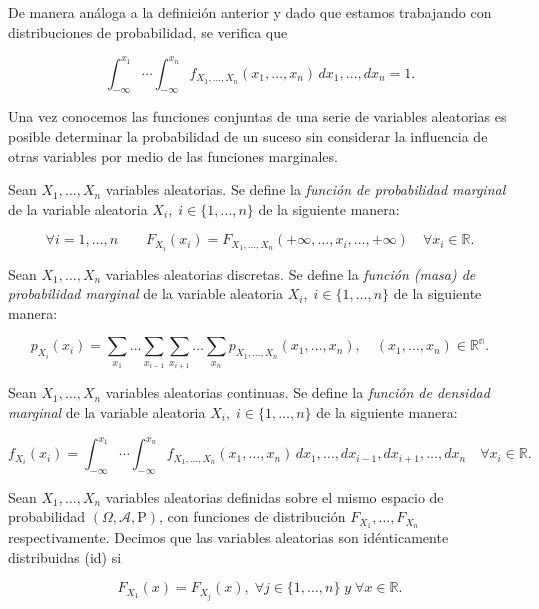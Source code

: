 De manera análoga a la definición anterior y dado que estamos trabajando con distribuciones de probabilidad, se verifica que 

\[ \int_{-\infty}^{x_1} \cdots \int_{-\infty}^{x_n} f_{X_{1}, \ldots, X_n} (x_1, \ldots, x_n) \, dx_1, \ldots,  dx_n = 1. \]


Una vez conocemos las funciones conjuntas de una serie de variables aleatorias es posible determinar la probabilidad de un suceso sin considerar la influencia de otras variables por medio de las funciones marginales.

\begin{definicion}
    Sean $X_1, \ldots, X_n$ variables aleatorias. Se define la \emph{función de probabilidad marginal} de la variable aleatoria $X_i, \; i \in \{1, \ldots, n\}$ de la siguiente manera:

    \[ \forall i = 1,\ldots,n  \qquad F_{X_i}(x_i) = F_{X_{1}, \ldots, X_{n}}(+\infty, \ldots,x_i, \ldots,+\infty) \quad \forall x_i \in \mathbb{R}. \]
\end{definicion}

\begin{definicion}
    Sean $X_1, \ldots, X_n$ variables aleatorias discretas. Se define la \emph{función (masa) de probabilidad marginal} de la variable aleatoria $X_i, \; i \in \{1, \ldots, n\}$ de la siguiente manera:

    \[ p_{X_i}(x_i) = \sum_{x_1}\ldots\sum_{x_{i-1}}\sum_{x_{i+1}}\ldots\sum_{x_{n}} p_{X_1, \ldots, X_n}(x_1, \ldots, x_n), \quad (x_1, \ldots, x_n) \in \mathbb{R^n}. \]
\end{definicion}

\begin{definicion}
    Sean $X_1, \ldots, X_n$ variables aleatorias continuas. Se define la \emph{función de densidad marginal} de la variable aleatoria $X_i, \; i \in \{1, \ldots, n\}$ de la siguiente manera:

    \[ f_{X_i}(x_i) = \int_{-\infty}^{x_1} \cdots \int_{-\infty}^{x_n} f_{X_{1}, \ldots, X_n} (x_1, \ldots, x_n)\, dx_1, \ldots, dx_{i-1},dx_{i+1}, \ldots,  dx_n \! \! \quad \forall x_i \in \mathbb{R}. \]
\end{definicion}

\begin{definicion}\label{def:variables-aleatorias-idénticamente-distribuidas}
    Sean $X_1, \ldots, X_n$ variables aleatorias definidas sobre el mismo espacio de probabilidad $(\Omega, \mathcal{A}, \mathrm{P})$, con funciones de distribución $F_{X_1}, \ldots, F_{X_n}$ respectivamente. Decimos que las variables aleatorias son idénticamente distribuidas (id) si

    \[ F_{X_1}(x) = F_{X_j}(x), \; \forall j \in \{1, \ldots, n \} \; y \; \forall x \in \mathbb{R}. \]
\end{definicion}

